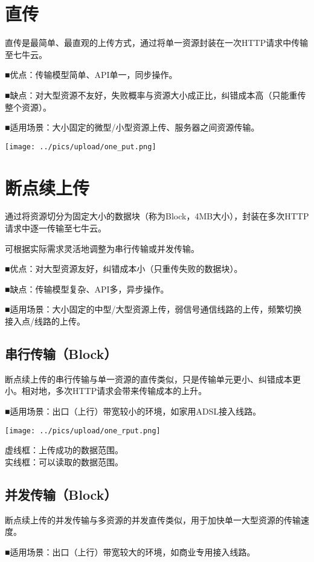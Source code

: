 \documentclass[11pt, oneside]{book}
\newcommand{\qpara}[1]{
\vspace{0.3em}
\noindent
#1\par
\vspace{0.3em}
}
\begin{document}
\section{直传}

\qpara{直传是最简单、最直观的上传方式，通过将单一资源封装在一次HTTP请求中传输至七牛云。}
\qpara{■\thinspace 优点：传输模型简单、API单一，同步操作。}
\qpara{■\thinspace 缺点：对大型资源不友好，失败概率与资源大小成正比，纠错成本高（只能重传整个资源）。}
\qpara{■\thinspace 适用场景：大小固定的微型/小型资源上传、服务器之间资源传输。}

\begin{center}
\texttt{[image: ../pics/upload/one\_put.png]}
\end{center}

\section{断点续上传}

\qpara{通过将资源切分为固定大小的数据块（称为Block，4MB大小），封装在多次HTTP请求中逐一传输至七牛云。}
\qpara{可根据实际需求灵活地调整为串行传输或并发传输。}
\qpara{■\thinspace 优点：对大型资源友好，纠错成本小（只重传失败的数据块）。}
\qpara{■\thinspace 缺点：传输模型复杂、API多，异步操作。}
\qpara{■\thinspace 适用场景：大小固定的中型/大型资源上传，弱信号通信线路的上传，频繁切换接入点/线路的上传。}

\subsection{串行传输（Block）}

\qpara{断点续上传的串行传输与单一资源的直传类似，只是传输单元更小、纠错成本更小。相对地，多次HTTP请求会带来传输成本的上升。}
\qpara{■\thinspace 适用场景：出口（上行）带宽较小的环境，如家用ADSL接入线路。}

\begin{center}
\texttt{[image: ../pics/upload/one\_rput.png]}
\end{center}

\qpara{虚线框：上传成功的数据范围。 \\ 实线框：可以读取的数据范围。}

\subsection{并发传输（Block）}

\qpara{断点续上传的并发传输与多资源的并发直传类似，用于加快单一大型资源的传输速度。}
\qpara{■\thinspace 适用场景：出口（上行）带宽较大的环境，如商业专用接入线路。}
\end{document}
